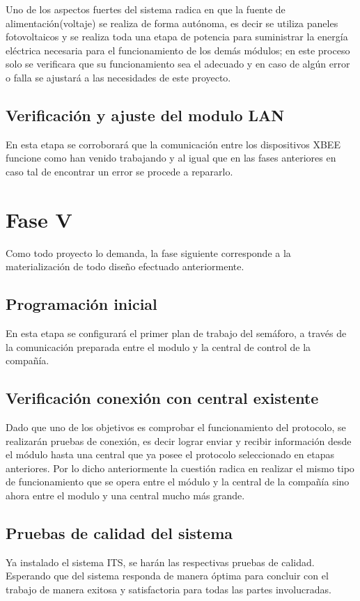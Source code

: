 Uno de los aspectos fuertes del sistema radica en que la fuente de alimentación(voltaje) se realiza de forma autónoma, es decir se  utiliza paneles fotovoltaicos y se realiza toda una etapa de potencia para suministrar la energía eléctrica necesaria para el funcionamiento de los demás módulos; en este proceso solo se verificara que su funcionamiento sea el adecuado y en caso de algún error o falla se ajustará a las necesidades de este proyecto.


\subsection{Verificación y ajuste del modulo LAN}

En esta etapa se corroborará que la comunicación entre los dispositivos XBEE funcione como han venido trabajando y al igual que en las fases anteriores en caso tal de encontrar un error se procede a repararlo.

\section {Fase V}

Como todo proyecto lo demanda, la fase siguiente corresponde a la materialización de todo diseño efectuado anteriormente. 

\subsection{Programación inicial}

En esta etapa se configurará el primer plan de trabajo del semáforo, a través de la comunicación preparada entre el modulo y la central de control de la compañía.
\subsection{Verificación conexión con central existente }

Dado que uno de los objetivos es comprobar el funcionamiento del protocolo, se realizarán pruebas de conexión, es decir lograr enviar y recibir información desde el módulo hasta una central que ya posee el protocolo seleccionado en etapas anteriores.
Por lo dicho anteriormente la cuestión radica en realizar el mismo tipo de funcionamiento que se opera entre el módulo y la central de la compañía sino ahora entre el modulo y una central mucho más grande.

\subsection{Pruebas de calidad del sistema}


Ya instalado el sistema ITS, se harán las respectivas pruebas de calidad. Esperando que del sistema responda de manera óptima para concluir con el trabajo de manera exitosa y satisfactoria para todas las partes involucradas.